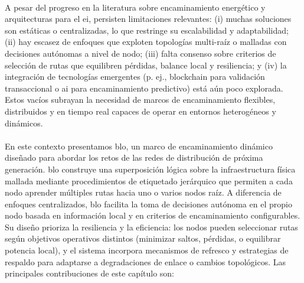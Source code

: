 \\
A pesar del progreso en la literatura sobre encaminamiento energético y arquitecturas para el \gls{ei}, persisten limitaciones relevantes: (i) muchas soluciones son estáticas o centralizadas, lo que restringe su escalabilidad y adaptabilidad; (ii) hay escasez de enfoques que exploten topologías multi-raíz o malladas con decisiones autónomas a nivel de nodo; (iii) falta consenso sobre criterios de selección de rutas que equilibren pérdidas, balance local y resiliencia; y (iv) la integración de tecnologías emergentes (p. ej., blockchain para validación transaccional o \gls{ai} para encaminamiento predictivo) está aún poco explorada. Estos vacíos subrayan la necesidad de marcos de encaminamiento flexibles, distribuidos y en tiempo real capaces de operar en entornos heterogéneos y dinámicos.\\
\\
En este contexto presentamos \gls{blo}, un marco de encaminamiento dinámico diseñado para abordar los retos de las redes de distribución de próxima generación. \gls{blo} construye una superposición lógica sobre la infraestructura física mallada mediante procedimientos de etiquetado jerárquico que permiten a cada nodo aprender múltiples rutas hacia uno o varios nodos raíz. A diferencia de enfoques centralizados, \gls{blo} facilita la toma de decisiones autónoma en el propio nodo basada en información local y en criterios de encaminamiento configurables. Su diseño prioriza la resiliencia y la eficiencia: los nodos pueden seleccionar rutas según objetivos operativos distintos (minimizar saltos, pérdidas, o equilibrar potencia local), y el sistema incorpora mecanismos de refresco y estrategias de respaldo para adaptarse a degradaciones de enlace o cambios topológicos. Las principales contribuciones de este capítulo son:

